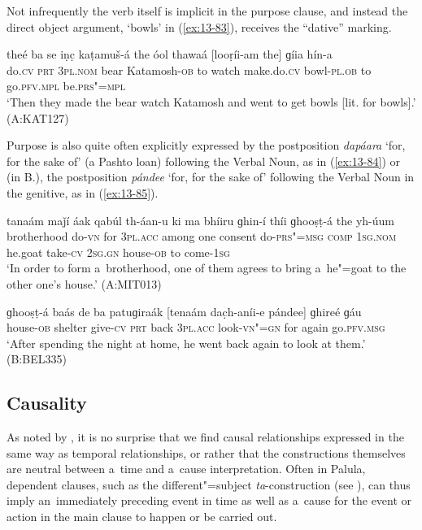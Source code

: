 Not infrequently the verb itself is implicit in the purpose clause, and instead the direct object argument, `bowls' in (\ref{ex:13-83}), receives the ``dative'' marking.

\begin{exe}
\ex
\label{ex:13-83}
\gll theé ba se iṇc̣ kaṭamuš-á the óol thawaá [looṛíi-am the] ɡíia hín-a \\
do.\textsc{cv} \textsc{prt} \textsc{3pl.nom} bear Katamosh-\textsc{ob} to watch  make.do.\textsc{cv} bowl-\textsc{pl.ob} to go.\textsc{pfv.mpl} be.\textsc{prs"=mpl} \\
\glt `Then they made the bear watch Katamosh and went to get bowls [lit. for bowls].' (A:KAT127) 
\end{exe}

Purpose is also quite often explicitly expressed by the postposition \textit{dapáara} `for, for the sake of' (a Pashto loan) following the Verbal Noun, as in (\ref{ex:13-84}) or (in B.), the postposition \textit{pándee} `for, for the sake of' following the Verbal Noun in the genitive, as in (\ref{ex:13-85}).

\begin{exe}
\ex
\label{ex:13-84}
\gll [bhraawéeli th"=ainií dapáara] tanaám maǰí áak qabúl th-áan-u ki ma bhíiru ɡhin-í thíi ɡhooṣṭ-á the yh-úum \\
brotherhood do-\textsc{vn} for \textsc{3pl.acc} among one consent do-\textsc{prs"=msg} \textsc{comp} \textsc{1sg.nom} he.goat take-\textsc{cv} \textsc{2sg.gn}  house-\textsc{ob} to come-\textsc{1sg} \\
\glt `In order to form a~brotherhood, one of them agrees to bring a~he"=goat to the other one's house.' (A:MIT013)

\ex
\label{ex:13-85}
\gll ɡhooṣṭ-á baás de ba patuɡiraák [tenaám dac̣h-aníi-e pándee] ɡhireé ɡáu \\
house-\textsc{ob}  shelter give-\textsc{cv} \textsc{prt} back \textsc{3pl.acc}  look-\textsc{vn"=gn} for again go.\textsc{pfv.msg} \\
\glt `After spending the night at home, he went back again to look at them.' (B:BEL335)
\end{exe}

\subsection{Causality}
\label{subsec:13-4-3}

As noted by \citet[181]{thompsonlongacre1985}, it is no surprise that we find causal relationships expressed in the same way as temporal relationships, or rather that the constructions themselves are neutral between a~time and a~cause interpretation. Often in Palula, dependent clauses, such as the different"=subject \textit{ta}-construction (see ), can thus imply an~immediately preceding event in time as well as a~cause for the event or action in the main clause to happen or be carried out. 



